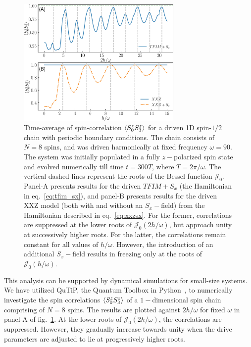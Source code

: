 \documentclass[%
reprint,
superscriptaddress,
amsmath,amssymb,
aps,
prb,
showkeys,
]{revtex4-2}
\begin{document}
\begin{figure}[t!]
	\centering
	\includegraphics[width =8cm]{corrN8sz0sz3avg_tfim_sx_xxz_sx.jpeg}
	\caption{Time-average of spin-correlation $\expval{S^z_0 S^z_3}$ for a driven 1D spin-$1/2$ chain with periodic boundary conditions. The chain consists of $N=8$ spins, and was driven harmonically at fixed frequency $\omega=90$.  The system was initially populated in a fully $z-$polarized spin state and evolved numerically till time $t=300T$, where $T=2\pi/\omega$.  The vertical dashed lines represent the roots of the Bessel function $\mathcal{J}_0$.  Panel-A presents results for  the driven $TFIM+S_x$ (the  Hamiltonian in eq.~\ref{eq:tfim_sx}), and panel-B presents results for the driven  XXZ model (both with and without an $S_x-$field) from the Hamiltonian described in  eq.~\ref{eq:xxzsx}.
	For the former, correlations are suppressed at the lower roots of $\mathcal{J}_0\left(2h/\omega\right)$, but approach unity at successively higher roots. For the latter, the correlations remain constant for all values of $h/\omega$. However, the introduction of an additional $S_x-$field results in freezing only at the roots of $\mathcal{J}_0\left(h/\omega\right)$.}
	\label{fig:ipr:tfimsx}
\end{figure}
This analysis can be supported by dynamical simulations for small-size systems. We have utilized QuTiP, the Quantum Toolbox in Python~\cite{qutip}, to numerically investigate the spin correlations $\expval{S^z_0 S^z_3}$ of a $1-$dimensional spin chain comprising of $N=8$ spins. The results are plotted against $2h/\omega$ for fixed $\omega$ in panel-A of  fig.~\ref{fig:ipr:tfimsx}. At the lower roots of $\mathcal{J}_0\left(2h/\omega\right)$,  the correlations are suppressed. However,  they  gradually increase towards unity when the drive parameters are adjusted to lie at progressively higher roots.
\end{document}
